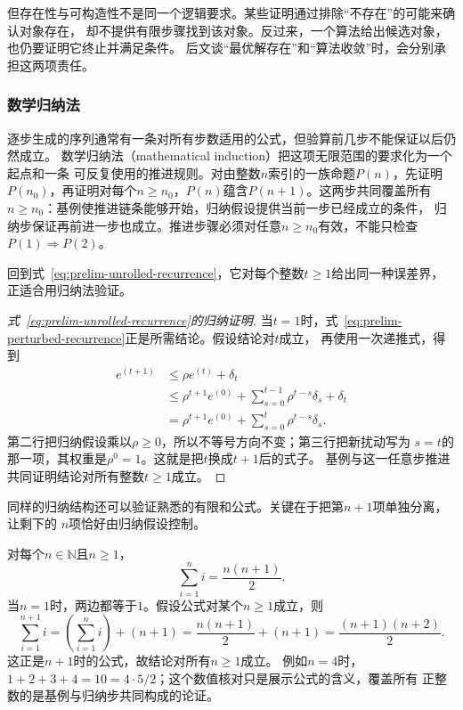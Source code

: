 但存在性与可构造性不是同一个逻辑要求。某些证明通过排除“不存在”的可能来确认对象存在，
却不提供有限步骤找到该对象。反过来，一个算法给出候选对象，也仍要证明它终止并满足条件。
后文谈“最优解存在”和“算法收敛”时，会分别承担这两项责任。

\subsubsection{数学归纳法}
\label{sec:prelim-mathematical-induction}

逐步生成的序列通常有一条对所有步数适用的公式，但验算前几步不能保证以后仍然成立。
数学归纳法（mathematical induction）把这项无限范围的要求化为一个起点和一条
可反复使用的推进规则。对由整数$n$索引的一族命题$P(n)$，先证明
$P(n_0)$，再证明对每个$n\geq n_0$，$P(n)$蕴含$P(n+1)$。这两步共同覆盖所有
$n\geq n_0$：基例使推进链条能够开始，归纳假设提供当前一步已经成立的条件，
归纳步保证再前进一步也成立。推进步骤必须对任意$n\geq n_0$有效，不能只检查
$P(1)\Rightarrow P(2)$。

回到式~\eqref{eq:prelim-unrolled-recurrence}，它对每个整数$t\geq1$给出同一种误差界，
正适合用归纳法验证。
\begin{proof}[式~\eqref{eq:prelim-unrolled-recurrence}的归纳证明]
当$t=1$时，式~\eqref{eq:prelim-perturbed-recurrence}正是所需结论。假设结论对$t$成立，
再使用一次递推式，得到
\begin{align*}
  e^{(t+1)}
  &\leq \rho e^{(t)}+\delta_t\\
  &\leq
  \rho^{t+1}e^{(0)}
  +
  \sum_{s=0}^{t-1}\rho^{t-s}\delta_s
  +\delta_t\\
  &=
  \rho^{t+1}e^{(0)}
  +
  \sum_{s=0}^{t}\rho^{t-s}\delta_s.
\end{align*}
第二行把归纳假设乘以$\rho\geq0$，所以不等号方向不变；第三行把新扰动写为
$s=t$的那一项，其权重是$\rho^0=1$。这就是把$t$换成$t+1$后的式子。
基例与这一任意步推进共同证明结论对所有整数$t\geq1$成立。
\end{proof}

同样的归纳结构还可以验证熟悉的有限和公式。关键在于把第$n+1$项单独分离，让剩下的
$n$项恰好由归纳假设控制。

\begin{example}
\label{ex:prelim-arithmetic-sum}
对每个$n\in\mathbb{N}$且$n\geq1$，
\[
  \sum_{i=1}^{n}i=\frac{n(n+1)}{2}.
\]
当$n=1$时，两边都等于$1$。假设公式对某个$n\geq1$成立，则
\[
  \sum_{i=1}^{n+1}i
  =
  \left(\sum_{i=1}^{n}i\right)+(n+1)
  =
  \frac{n(n+1)}{2}+(n+1)
  =
  \frac{(n+1)(n+2)}{2}.
\]
这正是$n+1$时的公式，故结论对所有$n\geq1$成立。
例如$n=4$时，$1+2+3+4=10=4\cdot5/2$；这个数值核对只是展示公式的含义，覆盖所有
正整数的是基例与归纳步共同构成的论证。
\end{example}


